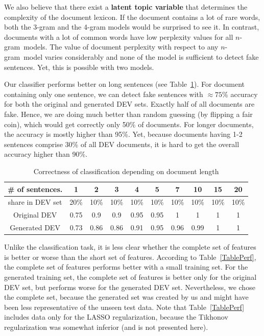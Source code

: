 \documentclass[11pt]{article}
\newcommand{\ngram}{\mbox{$n$-gram }}
\newcommand{\leocomment}[1]{\todo[color=red!40,caption={Leo's comment}]{#1}}
\begin{document}
We also believe that there exist a \textbf{latent topic variable} that determines the complexity
of the document lexicon.
If the document contains a lot of rare words, both the 3-gram and the 4-gram models
would be surprised to see it. In contrast, documents with a lot of common words
have low perplexity values for all \ngram models.
The value of document perplexity with respect to any \ngram model varies considerably
and none of the model is sufficient to detect fake sentences.
Yet, this is possible with two models.

Our classifier performs better on long sentences (see Table~\ref{TableCorr}).
For document containing only one sentence, we can detect fake sentences with $\approx 75\%$ accuracy
for both the original and generated DEV sets.
Exactly half of all documents are fake. Hence, we are doing much 
better than random guessing (by flipping a fair coin), which would get correctly only 50\% of documents.\leocomment{Guys, do you agree with this estimate?}
For longer documents, the accuracy is mostly higher than 95\%.
Yet, because documents having 1-2 sentences comprise 30\% of all DEV documents,
it is hard to get the overall accuracy higher than 90\%.

\begin{table}\centering
\caption{Correctness of classification depending on document length\label{TableCorr}}
\begin{tabular}{c|c|c|c|c|c|c|c|c|c}
\# of sentences.  &  1   &  2   &   3   &  4   &   5   &    7  & 10   & 15   &  20  \\\hline
share in DEV set  & 20\% & 10\% &  10\% & 10\% &  10\% &  10\% & 10\% & 10\% & 10\%  \\\hline\hline
Original DEV      & 0.75 & 0.9  &  0.9  & 0.95 & 0.95  &    1  &   1  &   1  &  1 \\\hline
Generated DEV     & 0.73 & 0.86 &  0.86 & 0.91 & 0.95  &   0.96&  0.99 &  1  &  1 \\\hline
\end{tabular}
\end{table}

Unlike the classification task, it is less clear whether the complete set of features is better or worse 
than the short set of features. 
According to Table~\ref{TablePerf}, the complete set of features performs better with a small training set.
For the generated training set, the complete set of features is better only for the original DEV set,
but performs worse for the generated DEV set.
Nevertheless, we chose the complete set, 
because the generated set was created by us and might have been less representative of the unseen test data.
Note that Table~\ref{TablePerf} includes data only for the LASSO
regularization, because the Tikhonov regularization was somewhat inferior (and is not presented here).
\end{document}
